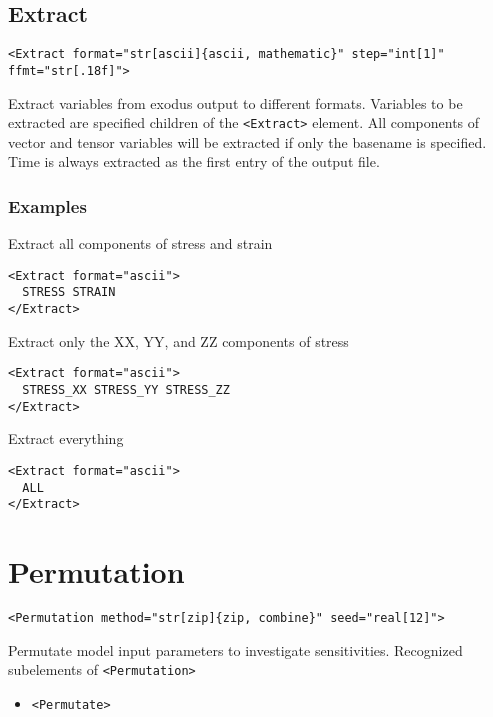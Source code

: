 \documentclass[11pt]{report}
\newcommand{\tag}[1]{\texttt{<#1>}}
\begin{document}
\subsection{Extract}
\begin{verbatim}
<Extract format="str[ascii]{ascii, mathematic}" step="int[1]" ffmt="str[.18f]">
\end{verbatim}
%
Extract variables from exodus output to different formats. Variables to be
extracted are specified children of the \tag{Extract} element. All components
of vector and tensor variables will be extracted if only the basename is
specified.  Time is always extracted as the first entry of the output file.

\subsubsection{Examples}
Extract all components of stress and strain
%
\begin{verbatim}
<Extract format="ascii">
  STRESS STRAIN
</Extract>
\end{verbatim}

Extract only the XX, YY, and ZZ components of stress
%
\begin{verbatim}
<Extract format="ascii">
  STRESS_XX STRESS_YY STRESS_ZZ
</Extract>
\end{verbatim}

Extract everything
\begin{verbatim}
<Extract format="ascii">
  ALL
</Extract>
\end{verbatim}

\section{Permutation}
\begin{verbatim}
<Permutation method="str[zip]{zip, combine}" seed="real[12]">
\end{verbatim}
%
Permutate model input parameters to investigate sensitivities. Recognized
subelements of \tag{Permutation}

\begin{itemize}
  \item \tag{Permutate}
\end{itemize}

\end{document}
